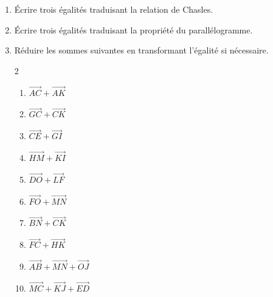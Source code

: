 \begin{exo}{}
	\begin{enumerate}
		\item Écrire trois égalités traduisant la relation de Chasles.
		\item Écrire trois égalités traduisant la propriété du parallélogramme.
		\item Réduire les sommes suivantes en transformant l'égalité si nécessaire.
		      \vspace*{-2mm}
		      \begin{multicols}{2}
		      \begin{enumerate}
			      \item $\vec{AC} + \vec{AK}$
			      \item $\vec{GC} + \vec{CK}$
			      \item $\vec{CE} + \vec{GI}$
			      \item $\vec{HM} + \vec{KI}$
			      \item $\vec{DO} + \vec{LF}$
			      \item $\vec{FO} + \vec{MN}$
			      \item $\vec{BN} + \vec{CK}$
			      \item $\vec{FC} + \vec{HK}$
			      \item $\vec{AB} + \vec{MN} + \vec{OJ}$
			      \item $\vec{MC} + \vec{KJ} + \vec{ED}$
		      \end{enumerate}
		      \end{multicols}
	\end{enumerate}
\end{exo}
